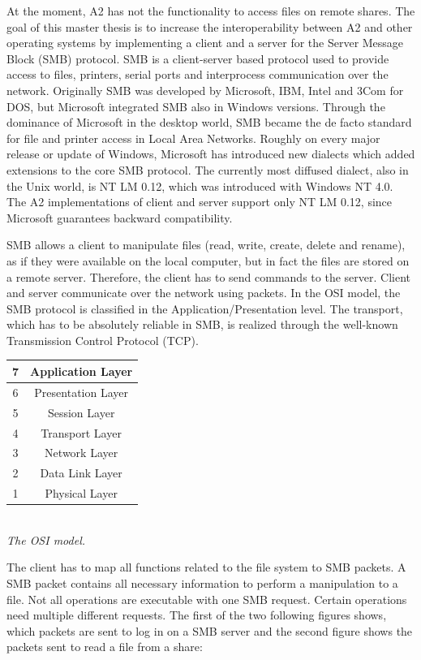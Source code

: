\documentclass[11pt,a4paper]{book}
\begin{document}
At the moment, A2 has not the functionality to access files on remote shares. The goal of this master thesis is to increase the interoperability between A2 and other operating systems by implementing a client and a server for the Server Message Block (SMB) protocol. SMB is a client-server based protocol used to provide access to files, printers, serial ports and interprocess communication over the network. Originally SMB was developed by Microsoft, IBM, Intel and 3Com for DOS, but Microsoft integrated SMB also in Windows versions. Through the dominance of Microsoft in the desktop world, SMB became the de facto standard for file and printer access in Local Area Networks. Roughly on every major release or update of Windows, Microsoft has introduced new dialects which added extensions to the core SMB protocol. The currently most diffused dialect, also in the Unix world, is NT LM 0.12, which was introduced with Windows NT 4.0. The A2 implementations of client and server support only NT LM 0.12, since Microsoft guarantees backward compatibility.

SMB allows a client to manipulate files (read, write, create, delete and rename), as if they were available on the local computer, but in fact the files are stored on a remote server. Therefore, the client has to send commands to the server. Client and server communicate over the network using packets. In the OSI model, the SMB protocol is classified in the Application/Presentation level. The transport, which has to be absolutely reliable in SMB, is realized through the well-known Transmission Control Protocol (TCP).

\begin{center}
\begin{tabular}{|c|c|}
\hline
7 & Application Layer \\
\hline
6 & Presentation Layer \\
\hline
5 & Session Layer \\
\hline
4 & Transport Layer \\
\hline
3 & Network Layer \\
\hline
2 & Data Link Layer \\
\hline
1 & Physical Layer \\
\hline
\end{tabular} \\
\vspace{6pt}
\textit{The OSI model.}
\end{center}

The client has to map all functions related to the file system to SMB packets. A SMB packet contains all necessary information to perform a manipulation to a file. Not all operations are executable with one SMB request. Certain operations need multiple different requests. The first of the two following figures shows, which packets are sent to log in on a SMB server and the second figure shows the packets sent to read a file from a share:
\end{document}
